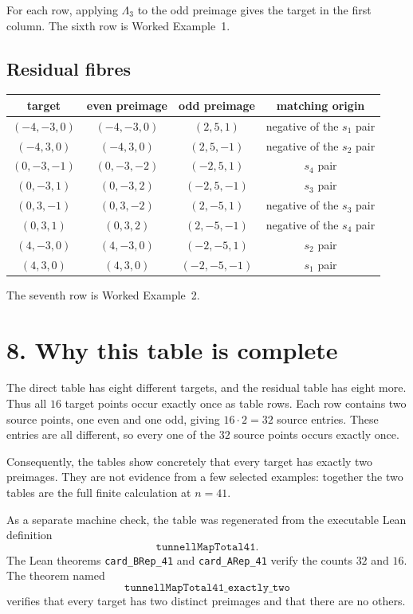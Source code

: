 \documentclass[11pt]{amsart}
\begin{document}
For each row, applying \(\Lambda_3\) to the odd preimage gives the target in
the first column.  The sixth row is Worked Example~1.

\subsection*{Residual fibres}

\begin{center}
\small
\renewcommand{\arraystretch}{1.22}
\begin{tabular}{@{}c c c c@{}}
\toprule
target & even preimage & odd preimage & matching origin \\
\midrule
$(-4,-3,0)$ & $(-4,-3,0)$ & $(2,5,1)$
  & negative of the $s_1$ pair \\
$(-4, 3,0)$ & $(-4, 3,0)$ & $(2,5,-1)$
  & negative of the $s_2$ pair \\
$(0,-3,-1)$ & $(0,-3,-2)$ & $(-2,5,1)$
  & $s_4$ pair \\
$(0,-3, 1)$ & $(0,-3, 2)$ & $(-2,5,-1)$
  & $s_3$ pair \\
$(0, 3,-1)$ & $(0, 3,-2)$ & $(2,-5,1)$
  & negative of the $s_3$ pair \\
$(0, 3, 1)$ & $(0, 3, 2)$ & $(2,-5,-1)$
  & negative of the $s_4$ pair \\
$(4,-3,0)$ & $(4,-3,0)$ & $(-2,-5,1)$
  & $s_2$ pair \\
$(4, 3,0)$ & $(4, 3,0)$ & $(-2,-5,-1)$
  & $s_1$ pair \\
\bottomrule
\end{tabular}
\end{center}

The seventh row is Worked Example~2.

\newpage
\section*{8. Why this table is complete}

The direct table has eight different targets, and the residual table has
eight more.  Thus all \(16\) target points occur exactly once as table rows.
Each row contains two source points, one even and one odd, giving
\(16\cdot2=32\) source entries.  These entries are all different, so every
one of the \(32\) source points occurs exactly once.

Consequently, the tables show concretely that every target has exactly two
preimages.  They are not evidence from a few selected examples: together the
two tables are the full finite calculation at \(n=41\).

As a separate machine check, the table was regenerated from the executable
Lean definition
\[
 \texttt{tunnellMapTotal41}.
\]
The Lean theorems
\texttt{card\_BRep\_41} and \texttt{card\_ARep\_41} verify the counts
\(32\) and \(16\).  The theorem named
\[
 \texttt{tunnellMapTotal41\_exactly\_two}
\]
verifies that every target has two distinct preimages and that there are no
others.
\end{document}

